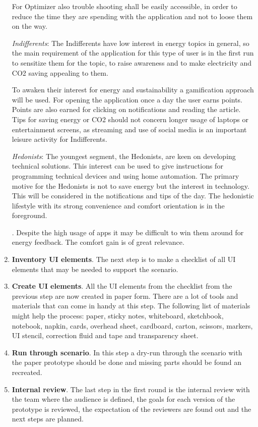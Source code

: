\begin{enumerate}
	For Optimizer also trouble shooting shall be easily accessible, in order to reduce the time they are spending with the application and not to loose them on the way.
	

	\textit{Indifferents}:
	The Indifferents have low interest in energy topics in general, so the main requirement of the application for this type of user is in the first run to sensitize them for the topic, to raise awareness and to make electricity and CO2 saving appealing to them. 
	
	To awaken their interest for energy and sustainability a gamification approach will be used. For opening the application once a day the user earns points. Points are also earned for clicking on notifications and reading the article. Tips for saving energy or CO2 should not concern longer usage of laptops or entertainment screens, as streaming and use of social media is an important leisure activity for Indifferents.
	
	\textit{Hedonists}:
	The youngest segment, the Hedonists, are keen on developing technical solutions. This interest can be used to give instructions for programming technical devices and using home automation. The primary motive for the Hedonists is not to save energy but the interest in technology. This will be considered in the notifications and tips of the day. The hedonistic lifestyle with its strong convenience and comfort orientation is in the foreground.
	
	. Despite the high usage of apps it may be difficult to win them around for energy feedback. The comfort gain is of great relevance.
	
	
	\item \textbf{Inventory UI elements}. The next step is to make a checklist of all UI elements that may be needed to support the scenario.
	\item \textbf{Create UI elements}. All the UI elements from the checklist from the previous step are now created in paper form. There are a lot of tools and materials that can come in handy at this step. The following list of materials might help the process: paper, sticky notes,
	whiteboard, sketchbook, notebook, napkin, cards, overhead sheet, cardboard, carton, scissors, markers, UI stencil, correction fluid and tape and transparency sheet. 
	\item \textbf{Run through scenario}. In this step a dry-run through the scenario with the paper prototype should be done and missing parts should be found an recreated.
	\item \textbf{Internal review}. The last step in the first round is the internal review with the team where the audience is defined, the goals for each version of the prototype is reviewed, the expectation of the reviewers are found out and the next steps are planned.
\end{enumerate}

